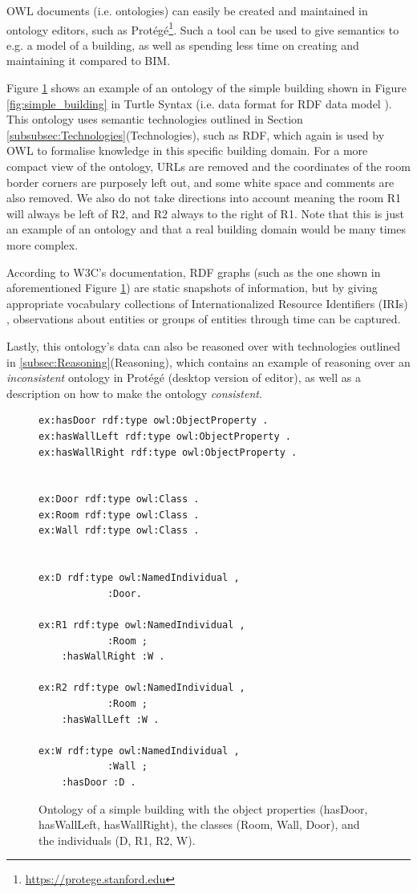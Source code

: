 \documentclass{article}
\begin{document}
OWL documents (i.e. ontologies) can easily be created and maintained in ontology editors, such as Protégé\footnote{\url{https://protege.stanford.edu}}. Such a tool can be used to give semantics to e.g. a model of a building, as well as spending less time on creating and maintaining it compared to BIM. 

Figure \ref{fig:building_ontology} shows an example of an ontology of the simple building shown in Figure \ref{fig:simple_building} in Turtle Syntax (i.e. data format for RDF data model \cite{noauthor_terse_nodate}). This ontology uses semantic technologies outlined in Section \ref{subsubsec:Technologies}(Technologies), such as RDF, which again is used by OWL to formalise knowledge in this specific building domain. For a more compact view of the ontology, URLs are removed and the coordinates of the room border corners are purposely left out, and some white space and comments are also removed. We also do not take directions into account meaning the room R1 will always be left of R2, and R2 always to the right of R1. Note that this is just an example of an ontology and that a real building domain would be many times more complex.

According to W3C's documentation, RDF graphs (such as the one shown in aforementioned Figure \ref{fig:building_ontology}) are static snapshots of information, but by giving appropriate vocabulary collections of Internationalized Resource Identifiers (IRIs) \cite{noauthor_rdf_nodate}, observations about entities or groups of entities through time can be captured.

Lastly, this ontology's data can also be reasoned over with technologies outlined in \ref{subsec:Reasoning}(Reasoning), which contains an example of reasoning over an \emph{inconsistent} ontology in Protégé (desktop version of editor), as well as a description on how to make the ontology \emph{consistent}.


\begin{figure}[H]
    \centering
    \caption{Ontology of a simple building with the object properties (hasDoor, hasWallLeft, hasWallRight), the classes (Room, Wall, Door), and the individuals (D, R1, R2, W).}
    \label{fig:building_ontology}
    \begin{Verbatim}[frame=single]
ex:hasDoor rdf:type owl:ObjectProperty .
ex:hasWallLeft rdf:type owl:ObjectProperty .
ex:hasWallRight rdf:type owl:ObjectProperty .

        
ex:Door rdf:type owl:Class .
ex:Room rdf:type owl:Class .
ex:Wall rdf:type owl:Class .

        
ex:D rdf:type owl:NamedIndividual ,
            :Door.
            
ex:R1 rdf:type owl:NamedIndividual ,
            :Room ;
    :hasWallRight :W .
    
ex:R2 rdf:type owl:NamedIndividual ,
            :Room ;
    :hasWallLeft :W .
    
ex:W rdf:type owl:NamedIndividual ,
            :Wall ;
    :hasDoor :D .
    \end{Verbatim}
\end{figure}
\end{document}
